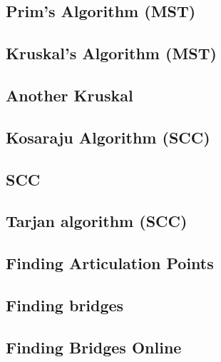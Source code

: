 \documentclass[10pt]{article}
\begin{document}
\begin{multicols*}{2}
\subsection{Prim's Algorithm (MST)}


\subsection{Kruskal's Algorithm (MST)}


\subsection{Another Kruskal}


\subsection{Kosaraju Algorithm (SCC)}


\subsection{SCC}


\subsection{Tarjan algorithm (SCC)}


\subsection{Finding Articulation Points}


\subsection{Finding bridges}


\subsection{Finding Bridges Online}



\end{multicols*}
\end{document}
